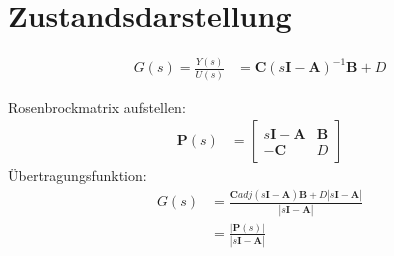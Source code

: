 \section{Zustandsdarstellung}

\begin{tcolorbox}[colback=white!10!white,colframe=blue!70!black,title=Übertragungsfunktion aus Zustandsraumdarstellung]
    \begin{tcolorbox}[colback=white!10!white,colframe=gray!70!black,title=Matrixinversion]
        
        \begin{align*}
            G(s) = \frac{Y(s)}{U(s)} &= \boldsymbol{C}(s\boldsymbol{I}-\boldsymbol{A})^{-1}\boldsymbol{B}+D
        \end{align*}
    \end{tcolorbox}
    
    \begin{tcolorbox}[colback=white!10!white,colframe=gray!70!black,title=Verallgemeinerte Systemmatrix]
            Rosenbrockmatrix aufstellen:
            \begin{align*}
                \boldsymbol{P}(s) &= 
            \left[\begin{array}{c|c}
            s\boldsymbol{I}-\boldsymbol{A} & \boldsymbol{B} \\\hline
            -\boldsymbol{C} & D 
            \end{array}\right]    
            \end{align*}
        Übertragungsfunktion:
        \begin{align*}
            G(s) &= \frac{\boldsymbol{C} adj(s\boldsymbol{I}-\boldsymbol{A})\boldsymbol{B}+D|s\boldsymbol{I}-\boldsymbol{A}|}{|s\boldsymbol{I}-\boldsymbol{A}|}\\
            &= \frac{|\boldsymbol{P}(s)|}{|s\boldsymbol{I}-\boldsymbol{A}|}
        \end{align*}
            
    \end{tcolorbox}
    
\end{tcolorbox}
